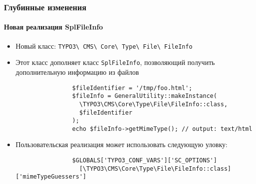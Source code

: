 
\begin{frame}[fragile]
	\frametitle{Глубинные изменения}
	\framesubtitle{Новая реализация SplFileInfo}

	\lstset{basicstyle=\smaller\ttfamily}

	\begin{itemize}

		\item Новый класс:
			\texttt{TYPO3\textbackslash
				CMS\textbackslash
				Core\textbackslash
				Type\textbackslash
				File\textbackslash
				FileInfo}

		\item Этот класс дополняет класс \texttt{SplFileInfo}, позволяющий получить дополнительную информацию из файлов

			\begin{lstlisting}
				$fileIdentifier = '/tmp/foo.html';
				$fileInfo = GeneralUtility::makeInstance(
				  \TYPO3\CMS\Core\Type\File\FileInfo::class,
				  $fileIdentifier
				);
				echo $fileInfo->getMimeType(); // output: text/html
			\end{lstlisting}

		\item Пользовательская реализация может использовать следующую уловку:

			\begin{lstlisting}
				$GLOBALS['TYPO3_CONF_VARS']['SC_OPTIONS']
				  [\TYPO3\CMS\Core\Type\File\FileInfo::class]['mimeTypeGuessers']
			\end{lstlisting}

	\end{itemize}

\end{frame}


